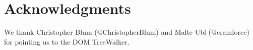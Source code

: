 \documentclass{sig-alternate}
\newcommand{\inlinelistingsize}{\fontsize{8pt}{11pt}}
\let\oldttdefault\ttdefault
\renewcommand{\ttdefault}{pcr}
\let\oldurl\url
\renewcommand{\url}[1]{\inlinelistingsize\oldurl{#1}}
\begin{document}
\section{Acknowledgments}
We thank Christopher Blum (@ChristopherBlum) and Malte Ubl (@cramforce) for pointing us to the DOM TreeWalker.

\let\ttdefault\oldttdefault
\let\url\oldurl




\balancecolumns
\end{document}
